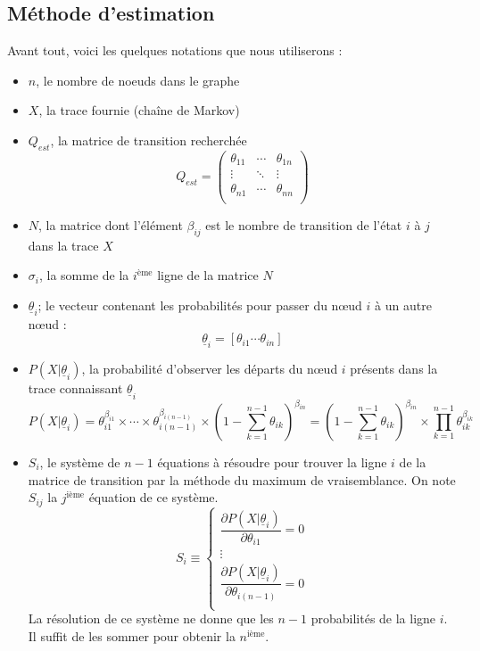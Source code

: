 \documentclass[a4paper,titlepage]{report}
\begin{document}
\subsection{Méthode d'estimation}
Avant tout, voici les quelques notations que nous utiliserons : 
\begin{itemize}
	\item $n$, le nombre de noeuds dans le graphe
	\item $X$, la trace fournie (chaîne de Markov)
	\item $Q_{est}$, la matrice de transition recherchée
	\[
		Q_{est} = 
		\begin{pmatrix}
			\theta_{11} & \cdots & \theta_{1n}\\
			\vdots & \ddots & \vdots\\
			\theta_{n1} & \cdots & \theta_{nn}\\
		\end{pmatrix}
	\]
	\item $N$, la matrice dont l'élément $\beta_{ij}$ est le nombre de transition de l'état $i$ à $j$ dans la trace $X$
	\item $\sigma_i$, la somme de la $i^{\text{ème}}$ ligne de la matrice $N$
	\item $\underline{\theta}_i$; le vecteur contenant les probabilités pour passer du nœud $i$ à un autre nœud : 
	\[
		\underline{\theta}_i = [\theta_{i1} \cdots \theta_{in}]
	\]
	\item $P(X|\underline{\theta}_i)$, la probabilité d'observer les départs du nœud $i$ présents dans la trace connaissant $\underline{\theta}_i$ 
	\[
		P(X|\underline{\theta}_i) = \theta_{i1}^{\beta_{i1}} \times \cdots \times \theta_{i(n - 1)}^{\beta_{i(n - 1)}} \times \left(1 - \sum\limits_{k = 1}^{n - 1} \theta_{ik}\right)^{\beta_{in}} = \left(1 - \sum\limits_{k = 1}^{n - 1} \theta_{ik}\right)^{\beta_{in}} \times \prod\limits_{k = 1}^{n - 1} \theta_{ik}^{\beta_{ik}}
	\]
	\item $S_i$, le système de $n - 1$ équations à résoudre pour trouver la ligne $i$ de la matrice de transition par la méthode du maximum de vraisemblance. On note $S_{ij}$ la $j^{\text{ième}}$ équation de ce système.
	\[
		S_i \equiv 
		\left\{
		\begin{array}{c}
		\dfrac{\partial P(X|\underline{\theta}_i)}{\partial \theta_{i1}} = 0\\
		\vdots\\
		\dfrac{\partial P(X|\underline{\theta}_i)}{\partial \theta_{i(n-1)}} = 0\\
		\end{array}
		\right.
	\] 
	La résolution de ce système ne donne que les $n-1$ probabilités de la ligne $i$. Il suffit de les sommer pour obtenir la $n^{\text{ième}}$.
\end{itemize}
\end{document}
